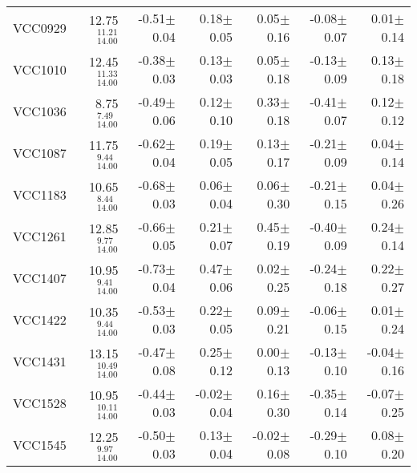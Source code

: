 \documentclass[useAMS,usenatbib]{mn2e}
\begin{document}
\begin{table*}
\begin{threeparttable}
\begin{tabular}{|r|r|r|r|r|r|r|}
\rule{0pt}{3ex}
VCC0929 &        12.75$^{       11.21}_{       14.00}$ &     -0.51$\pm$     0.04 &       0.18$\pm$     0.05 &     0.05$\pm$      0.16&    -0.08$\pm$     0.07&     0.01$\pm$      0.14\\
\rule{0pt}{3ex}
VCC1010 &        12.45$^{       11.33}_{       14.00}$ &     -0.38$\pm$     0.03 &       0.13$\pm$     0.03 &     0.05$\pm$      0.18&     -0.13$\pm$     0.09&      0.13$\pm$      0.18\\
\rule{0pt}{3ex}
VCC1036 &        8.75$^{       7.49}_{       14.00}$ &     -0.49$\pm$     0.06 &       0.12$\pm$      0.10 &      0.33$\pm$      0.18&     -0.41$\pm$     0.07&      0.12$\pm$      0.12\\
\rule{0pt}{3ex}
VCC1087 &        11.75$^{       9.44}_{       14.00}$ &     -0.62$\pm$     0.04 &       0.19$\pm$     0.05 &      0.13$\pm$      0.17&     -0.21$\pm$     0.09&     0.04$\pm$      0.14\\
\rule{0pt}{3ex}
VCC1183 &        10.65$^{       8.44}_{       14.00}$ &     -0.68$\pm$     0.03 &      0.06$\pm$     0.04 &     0.06$\pm$      0.30&     -0.21$\pm$      0.15&     0.04$\pm$      0.26\\
\rule{0pt}{3ex}
VCC1261 &        12.85$^{       9.77}_{       14.00}$ &     -0.66$\pm$     0.05 &       0.21$\pm$     0.07 &      0.45$\pm$      0.19&     -0.40$\pm$     0.09&      0.24$\pm$      0.14\\
\rule{0pt}{3ex}
VCC1407 &        10.95$^{       9.41}_{       14.00}$ &     -0.73$\pm$     0.04 &       0.47$\pm$     0.06 &     0.02$\pm$      0.25&     -0.24$\pm$      0.18&      0.22$\pm$      0.27\\
\rule{0pt}{3ex}
VCC1422 &        10.35$^{       9.44}_{       14.00}$ &     -0.53$\pm$     0.03 &       0.22$\pm$     0.05 &     0.09$\pm$      0.21&    -0.06$\pm$      0.15&     0.01$\pm$      0.24\\
\rule{0pt}{3ex}
VCC1431 &        13.15$^{       10.49}_{       14.00}$ &     -0.47$\pm$     0.08 &       0.25$\pm$      0.12 &   0.00$\pm$      0.13&     -0.13$\pm$      0.10&    -0.04$\pm$      0.16\\
\rule{0pt}{3ex}
VCC1528 &        10.95$^{       10.11}_{       14.00}$ &     -0.44$\pm$     0.03 &     -0.02$\pm$     0.04 &      0.16$\pm$      0.30&     -0.35$\pm$      0.14&    -0.07$\pm$      0.25\\
\rule{0pt}{3ex}
VCC1545 &        12.25$^{       9.97}_{       14.00}$ &     -0.50$\pm$     0.03 &       0.13$\pm$     0.04 &    -0.02$\pm$     0.08&     -0.29$\pm$      0.10&     0.08$\pm$      0.20\\

\end{tabular}
\end{threeparttable}
\end{table*}
\end{document}
